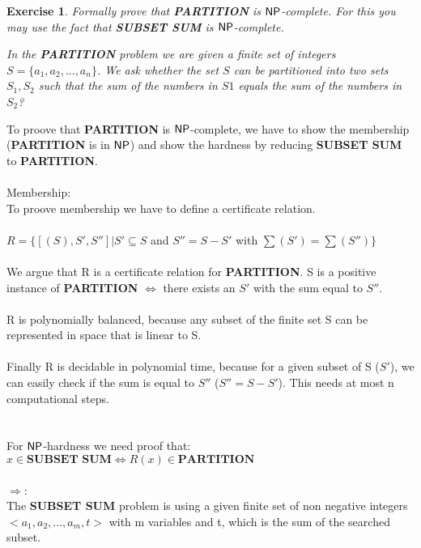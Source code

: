 \documentclass [11pt]{article}
\newtheorem{exercise}[theorem]{Exercise}
\newcommand{\ccfont}[1]{\protect\mathsf{#1}}
\newcommand{\NP}{\ccfont{NP}}
\newcommand{\solution}[1]{\noindent {\bf Solution.}  #1}
\begin{document}
\begin{exercise}
  \label{ex:partition}
  Formally prove that \textbf{PARTITION} is $\NP$-complete. For this you may use
  the fact that \textbf{SUBSET SUM} is $\NP$-complete.   
  
  \smallskip
  \noindent In the \textbf{PARTITION} problem we are given a finite set of integers $S=\{a_1, a_2, \ldots, a_n\}$. We ask whether the set $S$ can be partitioned into two sets $S_1, S_2$ such that the sum of the numbers in $S1$ equals the sum of the numbers in $S_2$? 
  

\end{exercise}


\solution
To proove that \textbf{PARTITION} is $\NP$-complete, we have to show the membership (\textbf{PARTITION} is in $\NP$) 
and show the hardness by reducing \textbf{SUBSET SUM} to \textbf{PARTITION}.\\
\\
Membership:\\
To proove membership we have to define a certificate relation.\\
\\
$R = \{ [(S),S',S'']|  S' \subseteq S $ and $S'' = S - S'$ with $ \sum(S') = \sum(S'') \} $ \\
\\
We argue that R is a certificate relation for \textbf{PARTITION}. S is a positive instance of
\textbf{PARTITION} $\Leftrightarrow$ there exists an $S'$ with the sum equal to $S''$.\\
\\
R is polynomially balanced, because any subset of the finite set S can be represented in space
that is linear to S.\\
\\
Finally R is decidable in polynomial time, because for a given subset of S ($S'$), we can easily
check if the sum is equal to $S''$ ($S'' = S - S'$). This needs at most n computational steps.\\
\\ 
\\
For $\NP$-hardness we need proof that:\\
$x \in \textbf{SUBSET SUM} \Leftrightarrow R(x) \in \textbf{PARTITION} $\\
\\
$\Rightarrow$:\\
The \textbf{SUBSET SUM} problem is using a given finite set of non negative integers\\
$<a_1, a_2,..., a_m, t>$ with m variables and t, which is the sum of the searched subset.\\
\end{document}
